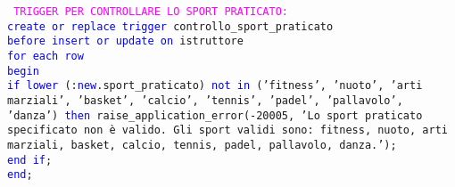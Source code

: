 \documentclass{article}
\begin{document}
    \begin{flushleft}
        \texttt{
        \textcolor{magenta}{TRIGGER PER CONTROLLARE LO SPORT PRATICATO:} \\
        \hspace*{2em} \textcolor{blue}{create or replace trigger} controllo\_sport\_praticato \\
        \hspace*{2em} \textcolor{blue}{before insert or update on} istruttore \\
        \hspace*{2em} \textcolor{blue}{for each row} \\
        \hspace*{2em} \textcolor{blue}{begin} \\
        \hspace*{4.4em}\textcolor{blue}{if lower} (:\textcolor{blue}{new}.sport\_praticato) \textcolor{blue}{not in} ('fitness', 'nuoto', 'arti \hspace*{4.4em}marziali', 'basket', 'calcio', 'tennis', 'padel', 'pallavolo', 'danza') \hspace*{4.4em}\textcolor{blue}{then} raise\_application\_error(-20005, 'Lo sport praticato specificato non \hspace*{4.4em}è valido. Gli sport validi sono: fitness, nuoto, arti marziali, \hspace*{4.4em}basket, calcio, tennis, padel, pallavolo, danza.');\\
        \hspace*{4em} \textcolor{blue}{end if}; \\
        \hspace*{2em} \textcolor{blue}{end}; \\}
    \end{flushleft}
\end{document}
